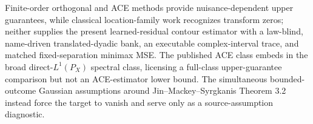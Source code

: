 Finite-order orthogonal and ACE methods provide nuisance-dependent upper guarantees, while classical location-family work recognizes transform zeros; neither supplies the present learned-residual contour estimator with a law-blind, name-driven translated-dyadic bank, an executable complex-interval trace, and matched fixed-separation minimax MSE.  The published ACE class embeds in the broad direct-\(L^1(P_X)\) spectral class, licensing a full-class upper-guarantee comparison but not an ACE-estimator lower bound.  The simultaneous bounded-outcome Gaussian assumptions around Jin--Mackey--Syrgkanis Theorem 3.2 instead force the target to vanish and serve only as a source-assumption diagnostic.